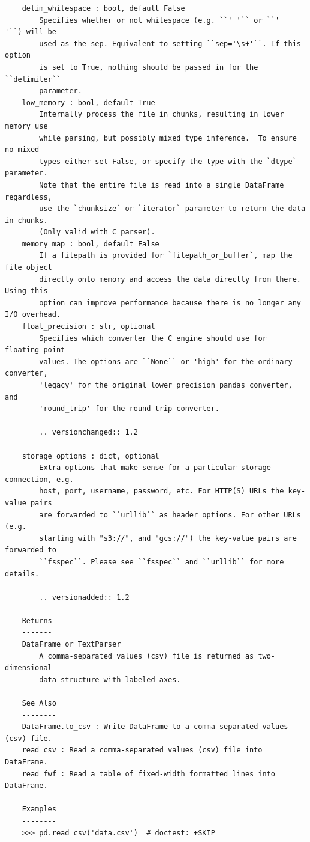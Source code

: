 \documentclass[
  letterpaper,
]{book}
\begin{document}
\begin{verbatim}
    delim_whitespace : bool, default False
        Specifies whether or not whitespace (e.g. ``' '`` or ``'    '``) will be
        used as the sep. Equivalent to setting ``sep='\s+'``. If this option
        is set to True, nothing should be passed in for the ``delimiter``
        parameter.
    low_memory : bool, default True
        Internally process the file in chunks, resulting in lower memory use
        while parsing, but possibly mixed type inference.  To ensure no mixed
        types either set False, or specify the type with the `dtype` parameter.
        Note that the entire file is read into a single DataFrame regardless,
        use the `chunksize` or `iterator` parameter to return the data in chunks.
        (Only valid with C parser).
    memory_map : bool, default False
        If a filepath is provided for `filepath_or_buffer`, map the file object
        directly onto memory and access the data directly from there. Using this
        option can improve performance because there is no longer any I/O overhead.
    float_precision : str, optional
        Specifies which converter the C engine should use for floating-point
        values. The options are ``None`` or 'high' for the ordinary converter,
        'legacy' for the original lower precision pandas converter, and
        'round_trip' for the round-trip converter.

        .. versionchanged:: 1.2

    storage_options : dict, optional
        Extra options that make sense for a particular storage connection, e.g.
        host, port, username, password, etc. For HTTP(S) URLs the key-value pairs
        are forwarded to ``urllib`` as header options. For other URLs (e.g.
        starting with "s3://", and "gcs://") the key-value pairs are forwarded to
        ``fsspec``. Please see ``fsspec`` and ``urllib`` for more details.

        .. versionadded:: 1.2

    Returns
    -------
    DataFrame or TextParser
        A comma-separated values (csv) file is returned as two-dimensional
        data structure with labeled axes.

    See Also
    --------
    DataFrame.to_csv : Write DataFrame to a comma-separated values (csv) file.
    read_csv : Read a comma-separated values (csv) file into DataFrame.
    read_fwf : Read a table of fixed-width formatted lines into DataFrame.

    Examples
    --------
    >>> pd.read_csv('data.csv')  # doctest: +SKIP
\end{verbatim}
\end{document}
